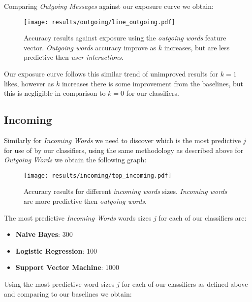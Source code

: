 \clearpage

Comparing \emph{Outgoing Messages} against our exposure curve we obtain:

\begin{figure}[h]
	\begin{center}
		\texttt{[image: results/outgoing/line\_outgoing.pdf]}
		\caption{Accuracy results against exposure using the \emph{outgoing words} feature vector. \emph{Outgoing words} accuracy improve as $k$ increases, but are less predictive then \emph{user interactions}.}
	\end{center}
\end{figure}

Our exposure curve follows this similar trend of unimproved results for $k = 1$ likes, however as $k$ increases there is some improvement 
from the baselines, but this is negligible in comparison to $k = 0$ for our classifiers.

\subsection{Incoming}
\label{sec:id}

Similarly for \emph{Incoming Words} we need to discover which is the most predictive $j$ for use of by our classifiers, 
using the same methodology as described above for \emph{Outgoing Words} we obtain the following graph:

\begin{figure}[h]
	\begin{center}
		\texttt{[image: results/incoming/top\_incoming.pdf]}
		\caption{Accuracy results for different \emph{incoming words} sizes. \emph{Incoming words} are more predictive then \emph{outgoing words}.}
	\end{center}
\end{figure}

\clearpage

The most predictive \emph{Incoming Words} words sizes $j$ for each of our classifiers are:
\begin{itemize}
\item \textbf{Naive Bayes}: 300
\item \textbf{Logistic Regression}: 100
\item \textbf{Support Vector Machine}: 1000
\end{itemize}

Using the most predictive word sizes $j$ for each of our classifiers as defined above and comparing to our baselines we obtain:

